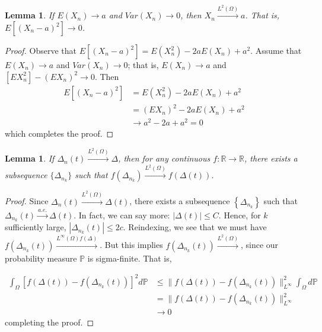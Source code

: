 \documentclass[12pt,reqno]{amsart}
\numberwithin{equation}{section}  %
\newcommand{\rr}{\mathbb{R}}
\newtheorem{lemma}[theorem]{Lemma}
\begin{document}
\begin{lemma}
If $E(X_{n}) \to a$ and $Var(X_{n}) \to 0$, then $X_{n} \xrightarrow{L^{2}(\Omega)}a$. That is, \\ $E[(X_{n} -a)^{2}] \to 0$.
\end{lemma}

\begin{proof}
Observe that $E[(X_{n}- a )^{2}] = E(X_{n}^{2}) - 2aE(X_{n}) + a^{2}$. Assume that $E(X_{n}) \to a$ and $Var(X_{n}) \to 0$; that is, $E(X_{n}) \to a$ and $[EX_{n}^{2}] - (E X_{n})^{2} \to 0$. Then
\begin{equation*}
\begin{split}
  E[(X_{n} - a)^{2}] & = E(X_{n}^{2}) - 2aE(X_{n}) + a^{2}
  \\
  & = (EX_{n})^{2} - 2a E(X_{n}) + a^{2}
  \\
  & \to a^{2} - 2a +  a^{2} = 0
\end{split}
\end{equation*}
which completes the proof.
\end{proof}

\begin{lemma}
If $\Delta_{n}(t) \xrightarrow{L^{2}(\Omega)} \Delta$, then for any continuous $f: \rr \to \rr$, there exists a subsequence $\{ \Delta_{n_{k}} \}$ such that $f(\Delta_{n_{k}}) \xrightarrow{L^{2}(\Omega)} f(\Delta(t))$.
\end{lemma}
\begin{proof}
Since $\Delta_{n}(t) \xrightarrow{L^{2}(\Omega)} \Delta(t)$, there exists a subsequence $\left \{ \Delta_{n_{k}} \right \}$ such that $\Delta_{n_{k}}(t) \xrightarrow{a.e.} \Delta(t)$. In fact, we can say more: $| \Delta(t) | \le C$. Hence, for $k$ sufficiently large, $| \Delta_{n_{k}}(t) | \le 2c$. Reindexing, we see that we must have $f(\Delta_{n_{k}}(t)) \xrightarrow{L^{\infty}(\Omega) f(\Delta)}$. But this implies $f(\Delta_{n_{k}}(t)) \xrightarrow{L^{2}(\Omega)}$, since our probability measure $\mathbb{P}$ is sigma-finite. That is,

\begin{equation*}
\begin{split}
  \int_{\Omega} [f(\Delta(t)) - f(\Delta_{n_{k}}(t))]^{2} d \mathbb{P}
  & \le \| f(\Delta(t)) - f(\Delta_{n_{k}}(t)) \|^{2}_{L^{\infty}} \int_{\Omega} d \mathbb{P}
  \\
  & =  \| f(\Delta(t)) - f(\Delta_{n_{k}}(t)) \|^{2}_{L^{\infty}}
  \\
  & \to 0
\end{split}
\end{equation*}
completing the proof.
\end{proof}
\end{document}
